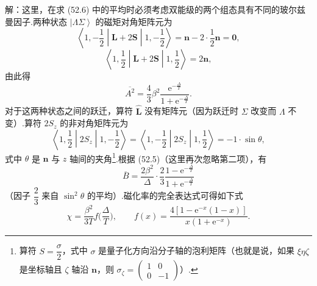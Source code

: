 \begin{xiti}
解：这里，在求 (52.6) 中的平均时必须考虑双能级的两个组态具有不同的玻尔兹曼因子.两种状态 $\left|\Lambda\Sigma\right\rangle$ 的磁矩对角矩阵元为
\begin{equation*}
  \left\langle 1,-\frac{1}{2}\middle|\boldsymbol{L}+2\boldsymbol{S}\middle|1,-\frac{1}{2}\right\rangle
  =\boldsymbol{n}-2\cdot\frac{1}{2}\boldsymbol{n}=\boldsymbol{0},
\end{equation*}
\begin{equation*}
  \left\langle 1,\frac{1}{2}\middle|\boldsymbol{L}+2\boldsymbol{S}\middle|1,\frac{1}{2}\right\rangle
  =2\boldsymbol{n},
\end{equation*}
由此得
\begin{equation*}
  \overline{A^2}=\frac{4}{3}\beta^2
  \frac{\mathrm{e}^{-\frac{\Delta}{T}}}{1+\mathrm{e}^{-\frac{\Delta}{T}}}.
\end{equation*}
对于这两种状态之间的跃迁，算符 $\hat{\boldsymbol{L}}$ 没有矩阵元（因为跃迁时 $\Sigma$ 改变而 $\Lambda$ 不变）.算符 $2S_z$ 的非对角矩阵元为
\begin{equation*}
  \left\langle 1,\frac{1}{2}\middle|2S_z\middle|1,-\frac{1}{2}\right\rangle
  =\left\langle 1,-\frac{1}{2}\middle|2S_z\middle|1,\frac{1}{2}\right\rangle
  =-1\cdot\sin\theta,
\end{equation*}
式中 $\theta$ 是 $\boldsymbol{n}$ 与 $z$ 轴间的夹角\footnote{算符 $S=\dfrac{\sigma}{2}$，式中 $\sigma$ 是量子化方向沿分子轴的泡利矩阵（也就是说，如果 $\xi\eta\zeta$ 是坐标轴且 $\zeta$ 轴沿 $\boldsymbol{n}$，则
$\sigma_\zeta=\begin{pmatrix}1&0\\0&-1\end{pmatrix}$）.}.根据 (52.5)（这里再次忽略第二项），有
\begin{equation*}
  \overline{B}=\frac{2\beta^2}{\Delta}\cdot\frac{2}{3}
  \frac{1-\mathrm{e}^{-\frac{\Delta}{T}}}{1+\mathrm{e}^{-\frac{\Delta}{T}}}
\end{equation*}
（因子 $\dfrac{2}{3}$ 来自 $\sin^2\theta$ 的平均）.磁化率的完全表达式可得如下式
\begin{equation*}
  \chi=\frac{\beta^2}{3T}f\Big(\frac{\Delta}{T}\Big),\qquad
  f(x)=\frac{4\left[1-\mathrm{e}^{-x}(1-x)\right]}{x\left(1+\mathrm{e}^{-x}\right)}.
\end{equation*}

\end{xiti}

